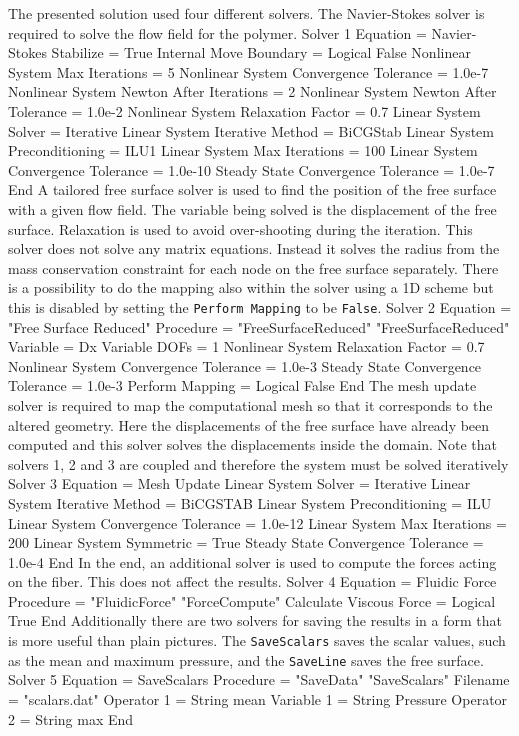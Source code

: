 The presented solution used four different solvers. 
The Navier-Stokes solver is required to solve the flow field
for the polymer.
\ttbegin
Solver 1
  Equation = Navier-Stokes
  Stabilize = True
  Internal Move Boundary = Logical False
  Nonlinear System Max Iterations = 5
  Nonlinear System Convergence Tolerance = 1.0e-7
  Nonlinear System Newton After Iterations = 2
  Nonlinear System Newton After Tolerance = 1.0e-2
  Nonlinear System Relaxation Factor = 0.7
  Linear System Solver = Iterative
  Linear System Iterative Method = BiCGStab 
  Linear System Preconditioning = ILU1
  Linear System Max Iterations = 100
  Linear System Convergence Tolerance = 1.0e-10
  Steady State Convergence Tolerance = 1.0e-7
End
\ttend
%
A tailored free surface solver is used to find the 
position of the free surface with a given flow field.
The variable being solved is the displacement of the free surface.
Relaxation is used to avoid over-shooting during the iteration.
This solver does not solve any matrix equations. Instead it solves
the radius from the mass conservation constraint for each node on the
free surface separately. There is a possibility to do the mapping also 
within the solver using a 1D scheme but this is disabled by setting
the \texttt{Perform Mapping} to be \texttt{False}.
\ttbegin
Solver 2
  Equation = "Free Surface Reduced"
  Procedure = "FreeSurfaceReduced" "FreeSurfaceReduced"
  Variable = Dx
  Variable DOFs = 1
  Nonlinear System Relaxation Factor = 0.7
  Nonlinear System Convergence Tolerance = 1.0e-3
  Steady State Convergence Tolerance = 1.0e-3
  Perform Mapping = Logical False
End
\ttend
%
The mesh update solver is required to map the computational mesh
so that it corresponds to the altered geometry.
Here the displacements of the free surface have already been computed
and this solver solves the displacements inside the domain.
Note that solvers 1, 2 and 3 are coupled and therefore the system must be solved iteratively
\ttbegin
Solver 3
  Equation = Mesh Update
  Linear System Solver = Iterative 
  Linear System Iterative Method = BiCGSTAB
  Linear System Preconditioning = ILU
  Linear System Convergence Tolerance = 1.0e-12
  Linear System Max Iterations = 200
  Linear System Symmetric = True
  Steady State Convergence Tolerance = 1.0e-4
End
\ttend
%
In the end, an additional solver is used to compute the forces
acting on the fiber. This does not affect the results.
\ttbegin
Solver 4 
  Equation = Fluidic Force
  Procedure = "FluidicForce" "ForceCompute"
  Calculate Viscous Force = Logical True
End
\ttend
%
Additionally there are two solvers for saving the results in a form
that is more useful than plain pictures. The \texttt{SaveScalars} saves
the scalar values, such as the mean and maximum pressure,
and the \texttt{SaveLine} saves the free surface.
\ttbegin
Solver 5
  Equation = SaveScalars
  Procedure = "SaveData" "SaveScalars"
  Filename = "scalars.dat"
  Operator 1 = String mean
  Variable 1 = String Pressure
  Operator 2 = String max
End 

